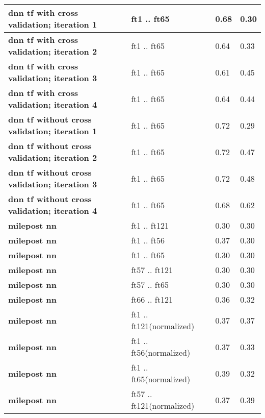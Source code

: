\begin{tabular}{|l|p{1.2in}|p{0.9in}|p{0.9in}|}
     \hline
      \textbf{ dnn tf with cross validation; iteration 1 } &  ft1 .. ft65  &  0.68  &  0.30 \\
     \hline
      \textbf{ dnn tf with cross validation; iteration 2 } &  ft1 .. ft65  &  0.64  &  0.33 \\
     \hline
      \textbf{ dnn tf with cross validation; iteration 3 } &  ft1 .. ft65  &  0.61  &  0.45 \\
     \hline
      \textbf{ dnn tf with cross validation; iteration 4 } &  ft1 .. ft65  &  0.64  &  0.44 \\
     \hline
      \textbf{ dnn tf without cross validation; iteration 1 } &  ft1 .. ft65  &  0.72  &  0.29 \\
     \hline
      \textbf{ dnn tf without cross validation; iteration 2 } &  ft1 .. ft65  &  0.72  &  0.47 \\
     \hline
      \textbf{ dnn tf without cross validation; iteration 3 } &  ft1 .. ft65  &  0.72  &  0.48 \\
     \hline
      \textbf{ dnn tf without cross validation; iteration 4 } &  ft1 .. ft65  &  0.68  &  0.62 \\
     \hline
      \textbf{ milepost nn } &  ft1 .. ft121  &  0.30  &  0.30 \\
     \hline
      \textbf{ milepost nn } &  ft1 .. ft56  &  0.37  &  0.30 \\
     \hline
      \textbf{ milepost nn } &  ft1 .. ft65  &  0.30  &  0.30 \\
     \hline
      \textbf{ milepost nn } &  ft57 .. ft121  &  0.30  &  0.30 \\
     \hline
      \textbf{ milepost nn } &  ft57 .. ft65  &  0.30  &  0.30 \\
     \hline
      \textbf{ milepost nn } &  ft66 .. ft121  &  0.36  &  0.32 \\
     \hline
      \textbf{ milepost nn } &  ft1 .. ft121\newline(normalized)  &  0.37  &  0.37 \\
     \hline
      \textbf{ milepost nn } &  ft1 .. ft56\newline(normalized)  &  0.37  &  0.33 \\
     \hline
      \textbf{ milepost nn } &  ft1 .. ft65\newline(normalized)  &  0.39  &  0.32 \\
     \hline
      \textbf{ milepost nn } &  ft57 .. ft121\newline(normalized)  &  0.37  &  0.39 \\

\end{tabular}
